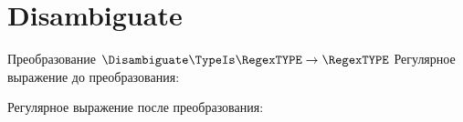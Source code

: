 \section{Disambiguate}
\begin{frame}{Преобразование $\Disambiguate\TypeIs\RegexTYPE\to\RegexTYPE$}
	Регулярное выражение до преобразования:

	Регулярное выражение после преобразования:

\end{frame}
